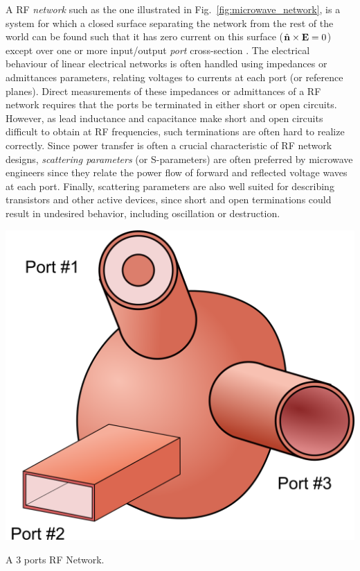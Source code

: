 A RF \textit{network} such as the one illustrated in Fig.~\ref{fig:microwave_network}, is a system for which a closed surface separating the network from the rest of the world can be found such that it has zero current on this surface ($\hat{\mathbf{n}} \times {\mathbf E}=0$) except over one or more input/output \textit{port} cross-section \cite[§8.3]{Harrington2001}. The electrical behaviour of linear electrical networks is often handled using impedances or admittances parameters, relating voltages to currents at each port (or reference planes). Direct measurements of these impedances or admittances of a RF network requires that the ports be terminated in either short or open circuits. However, as lead inductance and capacitance make short and open circuits difficult to obtain at RF frequencies, such terminations are often hard to realize correctly. Since power transfer is often a crucial characteristic of RF network designs, \textit{scattering parameters} (or S-parameters) are often preferred by microwave engineers since they relate the power flow of forward and reflected voltage waves at each port. Finally, scattering parameters are also well suited for describing transistors and other active devices, since short and open  terminations could result in undesired behavior, including oscillation or destruction.

\begin{marginfigure}[*-15]
	\includegraphics[width=1\linewidth]{figures/chap3/microwave_network}
	\caption{A 3 ports RF Network.}
	\label{fig:microwave_network}
\end{marginfigure}

